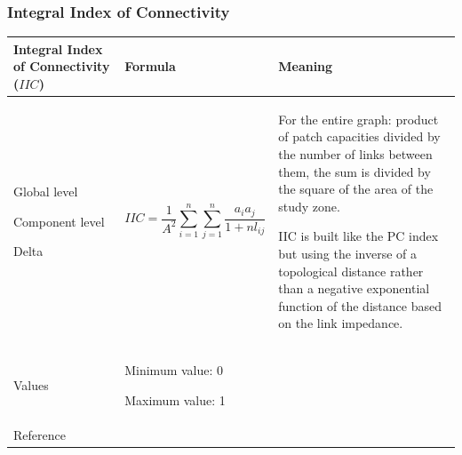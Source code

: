 \documentclass{article}
\begin{document}
\subsubsection{Integral Index of Connectivity}
\label{metric_IIC}
\begin{table}[H]
\begin{tabular}{|m{3.24cm}|m{4.4810004cm}m{7.924cm}|}
\hline
Integral Index of Connectivity
($IIC$) &
\multicolumn{1}{m{4.4810004cm}|}{Formula} &
Meaning\\\hline
Global level

Component level

Delta &
\multicolumn{1}{m{4.4810004cm}|}{\begin{equation*}
\mathit{IIC}=\frac{1}{{A}^{2}}\sum _{i=1}^{n}{\sum
_{j=1}^{n}{{\frac{{a}_{i}{a}_{j}}{{1+\mathit{nl}}_{\mathit{ij}}}}}}
\end{equation*}
} &
For the entire graph: product of patch capacities divided by the number
of links between them, the sum is divided by the square of the area of
the study zone.

IIC is built like the PC index but using the inverse of a topological
distance rather than a negative exponential function of the distance
based on the link impedance.

\\\hline
Values &
\multicolumn{2}{m{12.6050005cm}|}{Minimum value: 0

Maximum value: 1
}\\\hline
Reference &
\multicolumn{2}{m{12.6050005cm}|}{\cite{Pascual2006}}\\\hline
\end{tabular}
\end{table}
\end{document}
